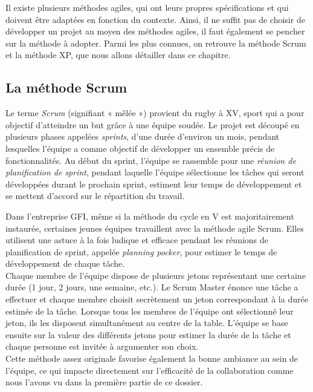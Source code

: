 Il existe plusieurs méthodes agiles, qui ont leurs propres spécifications et qui doivent être adaptées en fonction du contexte. Ainsi, il ne suffit pas de choisir de développer un projet au moyen des méthodes agiles, il faut également se pencher sur la méthode à adopter. Parmi les plus connues, on retrouve la méthode Scrum et la méthode XP, que nous allons détailler dans ce chapitre.

\subsection{La méthode Scrum}

Le terme \textit{Scrum} (signifiant « mêlée ») provient du rugby à XV, sport qui a pour objectif d'atteindre un but grâce à une équipe soudée.
Le projet est découpé en plusieurs phases appelées \textit{sprints}, d'une durée d'environ un mois, pendant lesquelles l'équipe a comme objectif de développer un ensemble précis de fonctionnalités.
Au début du sprint, l'équipe se rassemble pour une \textit{réunion de planification de sprint}, pendant laquelle l'équipe sélectionne les tâches qui seront développées durant le prochain sprint, estiment leur temps de développement et se mettent d'accord sur le répartition du travail.

\begin{app}
Dans l'entreprise GFI, même si la méthode du cycle en V est majoritairement instaurée, certaines jeunes équipes travaillent avec la méthode agile Scrum. Elles utilisent une astuce à la fois ludique et efficace pendant les réunions de planification de sprint, appelée \textit{planning pocker}, pour estimer le temps de développement de chaque tâche.\\
Chaque membre de l'équipe dispose de plusieurs jetons représentant une certaine durée (1 jour, 2 jours, une semaine, etc.). Le Scrum Master énonce une tâche a effectuer et chaque membre choisit secrètement un jeton correspondant à la durée estimée de la tâche. Lorsque tous les membres de l'équipe ont sélectionné leur jeton, ils les disposent simultanément au centre de la table. L'équipe se base ensuite sur la valeur des différents jetons pour estimer la durée de la tâche et chaque personne est invitée à argumenter son choix.\\
Cette méthode assez originale favorise également la bonne ambiance au sein de l'équipe, ce qui impacte directement sur l'efficacité de la collaboration comme nous l'avons vu dans la première partie de ce dossier.
\end{app}

